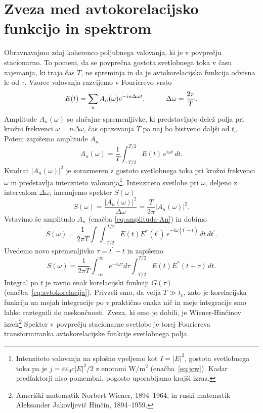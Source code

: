 \section{Zveza med avtokorelacijsko funkcijo in spektrom}

Obravnavajmo zdaj koherenco poljubnega valovanja, ki
je v povprečju stacionarno. To pomeni, da se povprečna gostota svetlobnega
toka v času zajemanja, ki traja čas $T$, ne spreminja in da je avtokorelacijska funkcija
odvisna le od $\tau$. Vzorec valovanja razvijemo
v Fourierevo vrsto
\begin{equation}
E(t)=\sum_{n}A_{n}(\omega)e^{-i n \Delta\omega t},\mbox{\hskip1cm}\Delta\omega=\frac{2\pi}{T}.
\end{equation}
Amplitude $A_{n}(\omega)$ so slučajne spremenljivke, ki predstavljajo delež polja pri 
krožni frekvenci $\omega=n\Delta\omega$, čas opazovanja $T$ pa naj bo bistveno daljši od $t_{c}$. 
Potem zapišemo amplitude $A_n$
\begin{equation}
A_{n}(\omega)=\frac{1}{T}\int_{-T/2}^{T/2}E(t)\, e^{i\omega t}\, dt.\label{eq:amplituda-An}
\end{equation}
Kvadrat $|A_{n}(\omega)|^{2}$ je sorazmeren z gostoto svetlobnega toka pri krožni
frekvenci $\omega$ in predstavlja intenziteto
valovanja\footnote{Intenziteto valovanja na splošno vpeljemo kot $I = |E|^2$, gostota svetlobnega
toka pa je $j = \varepsilon \varepsilon_0 c |E|^2/2$ z enotami W/m$^2$ (enačba~\ref{eq:jcw}). 
Kadar predfaktorji niso pomembni, pogosto uporabljamo krajši izraz.}. 
Intenziteto svetlobe pri $\omega$, deljeno z intervalom $\Delta\omega$, imenujemo  
spekter $S(\omega)$
\begin{equation}
S(\omega)=\frac{|A_{n}(\omega)|^{2}}{\Delta\omega}=\frac{T}{2\pi}|A_{n}(\omega)|^{2}.
\end{equation}
Vstavimo še amplitudo $A_{n}$ (enačba \ref{eq:amplituda-An}) in dobimo 
\begin{equation}
S(\omega) =\frac{1}{2\pi T}\int\int_{-T/2}^{T/2}E(t)E^{*}(t^{\prime})\, 
e^{-i\omega(t^{\prime}-t)}\, dt\, dt^{\prime}.
\end{equation}
Uvedemo novo spremenljivko $\tau=t^{\prime}-t$ in zapišemo
\begin{equation}
S(\omega)=\frac{1}{2\pi T}\int_{-\infty}^{\infty}e^{-i\omega\tau}d\tau\int_{-T/2}^{T/2}E(t)E^{*}(t+\tau)\, dt.
\label{eq:spekter}
\end{equation}
Integral po $t$ je ravno enak korelacijski funkciji $G(\tau)$ 
(enačba~\ref{eq:avtokorelacija}). Privzeli smo, da velja $T\gg t_{c}$, zato 
je korelacijska funkcija na mejah integracije po $\tau$ praktično enaka nič in 
meje integracije smo lahko raztegnili do neskončnosti. Zveza, ki smo jo dobili, je 
Wiener-Hinčinov izrek\footnote{Ameriški matematik Norbert Wiener, 1894--1964, in 
ruski matematik Aleksander Jakovljevič Hinčin, 1894--1959.}
Spekter v povprečju stacionarne svetlobe je torej Fouriereva transformiranka 
avtokorelacijske funkcije svetlobnega polja. 

